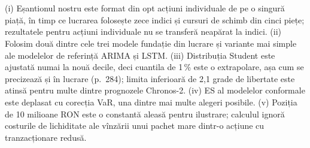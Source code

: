 \section{}
%
{(i) Eșantionul nostru este format din opt acțiuni individuale de pe o singură piață, în timp ce lucrarea folosește zece indici și cursuri de schimb din cinci piețe; rezultatele pentru acțiuni individuale nu se transferă neapărat la indici. (ii) Folosim două dintre cele trei modele fundație din lucrare și variante mai simple ale modelelor de referință ARIMA și LSTM. (iii) Distribuția Student este ajustată numai la nouă decile, deci cuantila de 1\,\% este o extrapolare, așa cum se precizează și în lucrare (p.~284); limita inferioară de 2,1 grade de libertate este atinsă pentru multe dintre prognozele Chronos-2.
(iv) ES al modelelor conformale este deplasat cu corecția VaR, una dintre mai multe alegeri posibile. (v) Poziția de 10 milioane RON este o constantă aleasă pentru ilustrare; calculul ignoră costurile de lichiditate ale vînzării unui pachet mare dintr-o acțiune cu tranzacționare redusă.}

\newpage
